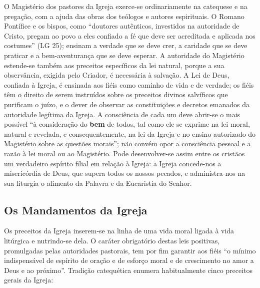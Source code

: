 O Magistério dos pastores da Igreja exerce-se ordinariamente na catequese e na pregação, com a ajuda das obras dos teólogos e autores espirituais. O Romano Pontífice e os bispos, como ``doutores autênticos, investidos na autoridade de Cristo, pregam ao povo a eles confiado a fé que deve ser acreditada e aplicada nos costumes'' (LG 25); ensinam a verdade que se deve crer, a caridade que se deve praticar e a bem-aventurança que se deve esperar. A autoridade do Magistério estende-se também aos preceitos específicos da lei natural, porque a sua observância, exigida pelo Criador, é necessária à salvação. A Lei de Deus, confiada à Igreja, é ensinada aos fiéis como caminho de vida e de verdade; os fiéis têm o direito de serem instruídos sobre os preceitos divinos salvíficos que purificam o juízo, e o dever de observar as constituições e decretos emanados da autoridade legítima da Igreja. A consciência de cada um deve abrir-se o mais possível ``à consideração do \textbf{bem} de todos, tal como ele se exprime na lei moral, natural e revelada, e consequentemente, na lei da Igreja e no ensino autorizado do Magistério sobre as questões morais''; não convém opor a consciência pessoal e a razão à lei moral ou ao Magistério. Pode desenvolver-se assim entre os cristãos um verdadeiro espírito filial em relação à Igreja: a Igreja concede-nos a misericórdia de Deus, que supera todos os nossos pecados, e administra-nos na sua liturgia o alimento da Palavra e da Eucaristia do Senhor.

\subsection*{Os Mandamentos da Igreja}

Os preceitos da Igreja inserem-se na linha de uma vida moral ligada à vida litúrgica e nutrindo-se dela. O caráter obrigatório destas leis positivas, promulgadas pelas autoridades pastorais, tem por fim garantir aos fiéis ``o mínimo indispensável de espírito de oração e de esforço moral e de crescimento no amor a Deus e ao próximo''. Tradição catequética enumera habitualmente cinco preceitos gerais da Igreja:

